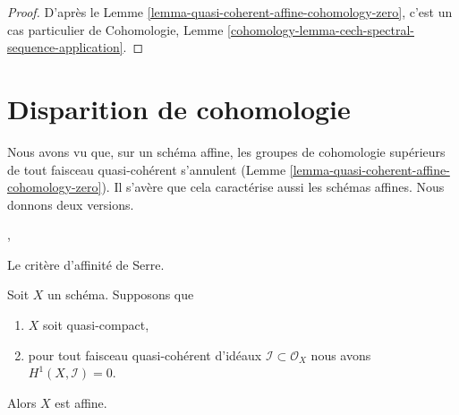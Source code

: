 \begin{proof}
D'après le Lemme \ref{lemma-quasi-coherent-affine-cohomology-zero}, c'est un cas
particulier de Cohomologie, Lemme
\ref{cohomology-lemma-cech-spectral-sequence-application}.
\end{proof}







\section{Disparition de cohomologie}
\label{section-vanishing}

\noindent
Nous avons vu que, sur un schéma affine, les groupes de cohomologie supérieurs
de tout faisceau quasi-cohérent s'annulent (Lemme
\ref{lemma-quasi-coherent-affine-cohomology-zero}). Il s'avère que cela
caractérise aussi les schémas affines. Nous donnons deux versions.

\begin{lemma}
\label{lemma-quasi-compact-h1-zero-covering}
\begin{reference}
\cite{Serre-criterion}, \cite[II, Théorème 5.2.1 (d') et IV (1.7.17)]{EGA}
\end{reference}
\begin{slogan}
Le critère d'affinité de Serre.
\end{slogan}
Soit $X$ un schéma. Supposons que
\begin{enumerate}
\item $X$ soit quasi-compact, \item pour tout faisceau quasi-cohérent d'idéaux
$\mathcal{I} \subset \mathcal{O}_X$ nous avons $H^1(X, \mathcal{I}) = 0$.
\end{enumerate}
Alors $X$ est affine.
\end{lemma}

